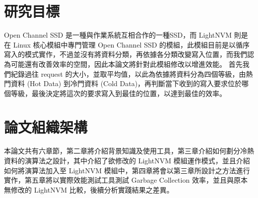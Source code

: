 
\section{研究目標}
\indent
Open Channel SSD 是一種與作業系統互相合作的一種SSD\cite{OCSSD_Good}，而 LightNVM 則是在 Linux 核心模組中專門管理 Open Channel SSD 的模組\cite{LightNVM}，此模組目前是以循序寫入的模式實作，不過並沒有將資料分類，再依據各分類改變寫入位置，而我們認為可能還有改善效率的空間，因此本論文將針對此模組修改以增進效能。
\indent
首先我們紀錄過往 request 的大小，並取平均值，以此為依據將資料分為四個等級，由熱門資料 (Hot Data) 到冷門資料 (Cold Data)，再判斷當下收到的寫入要求位於哪個等級，最後決定將這次的要求寫入到最佳的位置，以達到最佳的效率。


\section{論文組織架構}
\indent
本論文共有六章節，第二章將介紹背景知識及使用工具，第三章介紹如何劃分冷熱資料的演算法之設計，其中介紹了欲修改的 LightNVM 模組運作模式，並且介紹如何將演算法加入至 LightNVM 模組中，第四章將會以第三章所設計之方法進行實作，第五章將以實際效能測試工具測試 Garbage Collection 效率，並且與原本無修改的 LightNVM 比較，後續分析實踐結果之差異。

